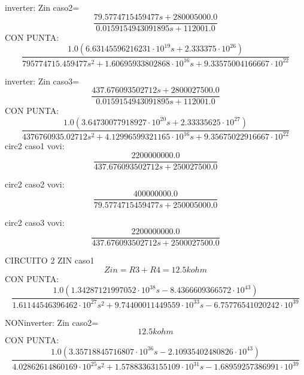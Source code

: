 inverter: Zin caso2=
\begin{equation}
\frac{79.5774715459477 s + 280005000.0}{0.0159154943091895 s + 112001.0}
\end{equation}
CON PUNTA:
\begin{equation}
\frac{1.0 \left(6.63145596216231 \cdot 10^{19} s + 2.333375 \cdot 10^{26}\right)}{795774715.459477 s^{2} + 1.60695933802868 \cdot 10^{16} s + 9.33575004166667 \cdot 10^{22}}
\end{equation}

inverter: Zin caso3=
\begin{equation}
\frac{437.676093502712 s + 2800027500.0}{0.0159154943091895 s + 112001.0}
\end{equation}
CON PUNTA:
\begin{equation}
\frac{1.0 \left(3.64730077918927 \cdot 10^{20} s + 2.33335625 \cdot 10^{27}\right)}{4376760935.02712 s^{2} + 4.12996599321165 \cdot 10^{16} s + 9.35675022916667 \cdot 10^{22}}
\end{equation}
circ2 caso1 vovi:
\begin{equation}
\frac{2200000000.0}{437.676093502712 s + 250027500.0}
\end{equation}

circ2 caso2 vovi:
\begin{equation}
\frac{400000000.0}{79.5774715459477 s + 250005000.0}
\end{equation}

circ2 caso3 vovi:
\begin{equation}
\frac{2200000000.0}{437.676093502712 s + 2500027500.0}
\end{equation}

CIRCUITO 2
ZIN
caso1
\begin{equation}
Zin = R3 + R4 = 12.5kohm
\end{equation}
CON PUNTA:
\begin{equation}
\frac{1.0 \left(1.34287121997052 \cdot 10^{38} s - 8.4366609366572 \cdot 10^{43}\right)}{1.61144546396462 \cdot 10^{27} s^{2} + 9.74400011449559 \cdot 10^{33} s - 6.75776541020242 \cdot 10^{39}}
\end{equation}

NONinverter: Zin caso2=
\begin{equation}
12.5kohm
\end{equation}
CON PUNTA:
\begin{equation}
\frac{1.0 \left(3.35718845716807 \cdot 10^{36} s - 2.10935402480826 \cdot 10^{43}\right)}{4.02862614860169 \cdot 10^{25} s^{2} + 1.57883363155109 \cdot 10^{31} s - 1.68959257386991 \cdot 10^{39}}
\end{equation}

